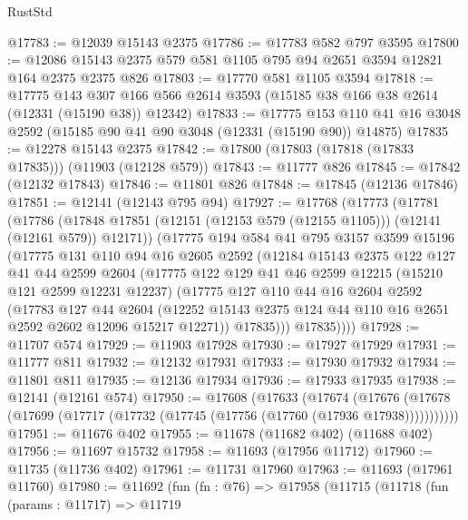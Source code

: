 \begin{lexlean}{RustStd}
\begin{coremodule}
@17783 := @12039 @15143 @2375
@17786 := @17783 @582 @797 @3595
@17800 := @12086 @15143 @2375 @579 @581 @1105 @795 @94 @2651 @3594 @12821 @164 @2375 @2375 @826
@17803 := @17770 @581 @1105 @3594
@17818 := @17775
    @143
    @307
    @166
    @566
    @2614
    @3593
    (@15185 @38 @166 @38 @2614 (@12331 (@15190 @38)) @12342)
@17833 := @17775
    @153
    @110
    @41
    @16
    @3048
    @2592
    (@15185 @90 @41 @90 @3048 (@12331 (@15190 @90)) @14875)
@17835 := @12278 @15143 @2375
@17842 := @17800 (@17803 (@17818 (@17833 @17835))) (@11903 (@12128 @579))
@17843 := @11777 @826
@17845 := @17842 (@12132 @17843)
@17846 := @11801 @826
@17848 := @17845 (@12136 @17846)
@17851 := @12141 (@12143 @795 @94)
@17927 := @17768
    (@17773
      (@17781
        (@17786 (@17848 @17851 (@12151 (@12153 @579 (@12155 @1105))) (@12141 (@12161 @579)) @12171))
        (@17775
          @194
          @584
          @41
          @795
          @3157
          @3599
          @15196
          (@17775
            @131
            @110
            @94
            @16
            @2605
            @2592
            (@12184
              @15143
              @2375
              @122
              @127
              @41
              @44
              @2599
              @2604
              (@17775
                @122
                @129
                @41
                @46
                @2599
                @12215
                (@15210 @121 @2599 @12231 @12237)
                (@17775
                  @127
                  @110
                  @44
                  @16
                  @2604
                  @2592
                  (@17783
                    @127
                    @44
                    @2604
                    (@12252 @15143 @2375 @124 @44 @110 @16 @2651 @2592 @2602 @12096 @15217 @12271))
                  @17835)))
            @17835))))
@17928 := @11707 @574
@17929 := @11903 @17928
@17930 := @17927 @17929
@17931 := @11777 @811
@17932 := @12132 @17931
@17933 := @17930 @17932
@17934 := @11801 @811
@17935 := @12136 @17934
@17936 := @17933 @17935
@17938 := @12141 (@12161 @574)
@17950 := @17608
    (@17633
      (@17674
        (@17676 (@17678 (@17699 (@17717 (@17732 (@17745 (@17756 (@17760 (@17936 @17938)))))))))))
@17951 := @11676 @402
@17955 := @11678 (@11682 @402) (@11688 @402)
@17956 := @11697 @15732
@17958 := @11693 (@17956 @11712)
@17960 := @11735 (@11736 @402)
@17961 := @11731 @17960
@17963 := @11693 (@17961 @11760)
@17980 := @11692
    (fun (fn : @76) =>
    @17958
      (@11715
        (@11718
          (fun (params : @11717) =>
          @11719

\end{coremodule}
\end{lexlean}

